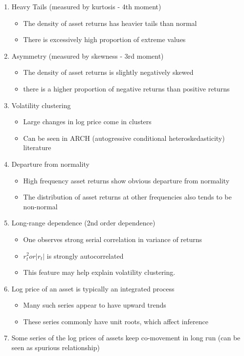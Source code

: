 \documentclass[11pt]{article}
\begin{document}
\begin{enumerate}
    \item Heavy Tails (measured by kurtosis - 4th moment)
    \begin{itemize}
        \item The density of asset returns has heavier tails than normal
        \item There is excessively high proportion of extreme values
    \end{itemize}
    \item Asymmetry (measured by skewness - 3rd moment)
    \begin{itemize}
        \item The density of asset returns is slightly negatively skewed
        \item there is a higher proportion of negative returns than positive returns
    \end{itemize}
    \item Volatility clustering
    \begin{itemize}
        \item Large changes in log price come in clusters
        \item Can be seen in ARCH (autogressive conditional heteroskedasticity) literature
    \end{itemize}
    \item Departure from normality
    \begin{itemize}
        \item High frequency asset returns show obvious departure from normality
        \item The distribution of asset returns at other frequencies also tends to be non-normal
    \end{itemize}
    \item Long-range dependence (2nd order dependence)
    \begin{itemize}
        \item One observes strong serial correlation in variance of returns
        \item $r_t^2 or |r_t|$ is strongly autocorrelated
        \item This feature may help explain volatility clustering.
    \end{itemize}
    \item Log price of an asset is typically an integrated process
    \begin{itemize}
        \item Many such series appear to have upward trends
        \item These series commonly have unit roots, which affect inference
    \end{itemize}
    \item Some series of the log prices of assets keep co-movement in long run (can be seen as spurious relationship)
\end{enumerate}
\end{document}
